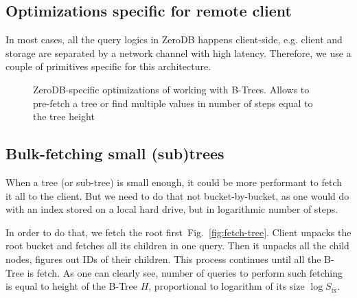 \documentclass[notitlepage]{revtex4-1}
\newcommand{\figref}[1]{Fig.~\ref{#1}}
\begin{document}
\subsection{Optimizations specific for remote client}

In most cases, all the query logics in ZeroDB happens client-side, e.g. client and storage are separated by a network channel with high latency.
Therefore, we use a couple of primitives specific for this architecture.

\begin{figure}
	\begin{center}
        \qquad
	\end{center}
    \caption{ZeroDB-specific optimizations of working with B-Trees. Allows to pre-fetch a tree or find multiple values in number of steps equal to the tree height}
	\label{fig:tree-traversal-optimizations}
\end{figure}

\subsection{Bulk-fetching small (sub)trees}

When a tree (or sub-tree) is small enough, it could be more performant to fetch it all to the client.
But we need to do that not bucket-by-bucket, as one would do with an index stored on a local hard drive, but in logarithmic number of steps.

In order to do that, we fetch the root first~\figref{fig:fetch-tree}.
Client unpacks the root bucket and fetches all its children in one query.
Then it unpacks all the child nodes, figures out IDs of their children.
This process continues until all the B-Tree is fetch.
As one can clearly see, number of queries to perform such fetching is equal to height of the B-Tree $H$, proportional to logarithm of its size $\log{S_{\mbox{ix}}}$.
\end{document}
